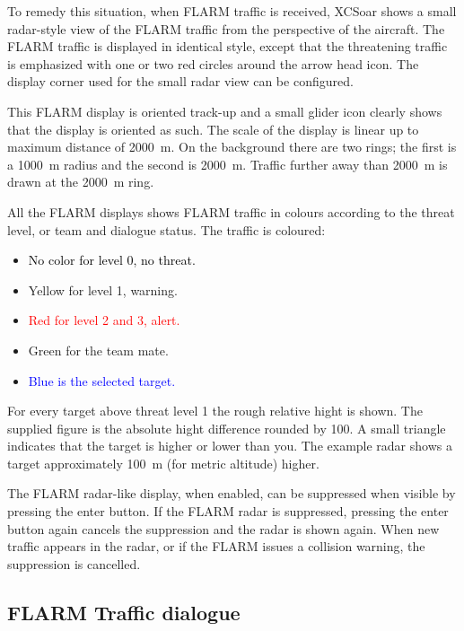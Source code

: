 To remedy this situation, when FLARM traffic is received, XCSoar shows a 
small radar-style view of the FLARM
traffic from the perspective of the aircraft.  The FLARM traffic is
displayed in identical style, except that the threatening traffic is emphasized 
with one or two red circles around the arrow head icon.  The display corner used 
for the small radar view can be configured.

This FLARM display is oriented track-up and a small glider icon
clearly shows that the display is oriented as such.  The scale of the
display is linear up to maximum distance of 2000~m.  On the
background there are two rings; the first is a 1000~m radius and the second
is 2000~m.  Traffic further away than 2000~m is drawn at the 2000~m ring.

All the FLARM displays shows FLARM traffic in colours according to
the threat level, or team and dialogue status.  The traffic is coloured:
\begin{itemize}
\item \textcolor{black} {No color for level 0, no threat.} 
\item \textcolor{warning} { Yellow for level 1, warning.}
\item \textcolor{red} {Red for level 2 and 3, alert.}
\item \textcolor{teammate} {Green for the team mate.}
\item \textcolor{blue} {Blue is the selected target.}
\end{itemize}

For every target above threat level 1 the rough relative hight is shown. The
supplied figure is the absolute hight difference rounded by 100.  A small
triangle indicates that the target is higher or lower than you.  The example
radar shows a target approximately 100~m (for metric altitude) higher.

The FLARM radar-like display, when enabled, can be suppressed when
visible by pressing the enter button.  If the
FLARM radar is suppressed, pressing the enter button again cancels the
suppression and the radar is shown again.  When new traffic appears in
the radar, or if the FLARM issues a collision warning, the suppression
is cancelled.


\subsection*{FLARM Traffic dialogue}\label{sec:flarm-traffic}

